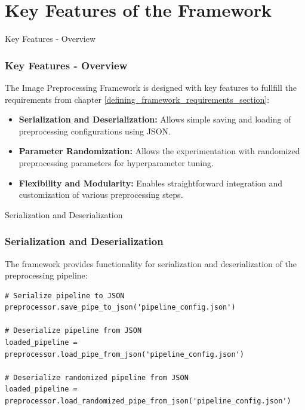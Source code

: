 \section{Key Features of the Framework}
\label{key_features_section}


\begin{frame}{Key Features - Overview}
    \frametitle{Key Features - Overview}
    The Image Preprocessing Framework is designed with key features to fullfill the requirements from chapter \ref{defining_framework_requirements_section}:
    \begin{itemize}
        \item \textbf{Serialization and Deserialization:}  Allows simple saving and loading of preprocessing configurations using JSON.
        \item \textbf{Parameter Randomization:}  Allows the experimentation with randomized preprocessing parameters for hyperparameter tuning.
        \item \textbf{Flexibility and Modularity:} Enables straightforward integration and customization of various preprocessing steps.
    \end{itemize}
\end{frame}

\begin{frame}[fragile]{Serialization and Deserialization}
    \frametitle{Serialization and Deserialization}
    The framework provides functionality for serialization and deserialization of the preprocessing pipeline:

    \begin{lstlisting}[caption={Serialization and Deserialization Example.}, label=lst:serialization]
# Serialize pipeline to JSON
preprocessor.save_pipe_to_json('pipeline_config.json')

# Deserialize pipeline from JSON
loaded_pipeline = preprocessor.load_pipe_from_json('pipeline_config.json')

# Deserialize randomized pipeline from JSON
loaded_pipeline = preprocessor.load_randomized_pipe_from_json('pipeline_config.json')
    \end{lstlisting}
\end{frame}

